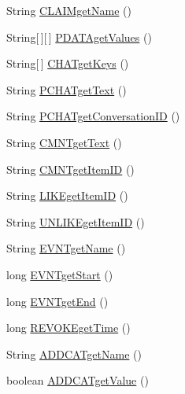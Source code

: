 \begin{DoxyCompactItemize}
String \hyperlink{classballmerpeak_1_1turtlenet_1_1shared_1_1Message_a618df0e74bdb53d97e624308dc197f9c}{C\-L\-A\-I\-Mget\-Name} ()
\item 
String\mbox{[}$\,$\mbox{]}\mbox{[}$\,$\mbox{]} \hyperlink{classballmerpeak_1_1turtlenet_1_1shared_1_1Message_a90be56d8792ff51cf52f76c91f321d5b}{P\-D\-A\-T\-Aget\-Values} ()
\item 
String\mbox{[}$\,$\mbox{]} \hyperlink{classballmerpeak_1_1turtlenet_1_1shared_1_1Message_abce412ceb51adecdb4cf27121150f151}{C\-H\-A\-Tget\-Keys} ()
\item 
String \hyperlink{classballmerpeak_1_1turtlenet_1_1shared_1_1Message_a37de2e088d9d7e29d68e46bc1268aa2d}{P\-C\-H\-A\-Tget\-Text} ()
\item 
String \hyperlink{classballmerpeak_1_1turtlenet_1_1shared_1_1Message_a3afb139c276865c16a1f73862a80ff38}{P\-C\-H\-A\-Tget\-Conversation\-I\-D} ()
\item 
String \hyperlink{classballmerpeak_1_1turtlenet_1_1shared_1_1Message_a98d82ce97581e1836c8c3c04296f9e4d}{C\-M\-N\-Tget\-Text} ()
\item 
String \hyperlink{classballmerpeak_1_1turtlenet_1_1shared_1_1Message_abcc08fb6d7d1ff58a0d2b853f14c96e0}{C\-M\-N\-Tget\-Item\-I\-D} ()
\item 
String \hyperlink{classballmerpeak_1_1turtlenet_1_1shared_1_1Message_a160e11cdf47694df3457be3f6d66b835}{L\-I\-K\-Eget\-Item\-I\-D} ()
\item 
String \hyperlink{classballmerpeak_1_1turtlenet_1_1shared_1_1Message_aa9cd511fcbefd56264ac9b027db6d6f2}{U\-N\-L\-I\-K\-Eget\-Item\-I\-D} ()
\item 
String \hyperlink{classballmerpeak_1_1turtlenet_1_1shared_1_1Message_aff33250286f93db9fbfdd4bbdca18848}{E\-V\-N\-Tget\-Name} ()
\item 
long \hyperlink{classballmerpeak_1_1turtlenet_1_1shared_1_1Message_a0664e413dd2a8f4522e3ff4be004f912}{E\-V\-N\-Tget\-Start} ()
\item 
long \hyperlink{classballmerpeak_1_1turtlenet_1_1shared_1_1Message_a6ef85e8b3cf1d2e12e24ea64fce69f47}{E\-V\-N\-Tget\-End} ()
\item 
long \hyperlink{classballmerpeak_1_1turtlenet_1_1shared_1_1Message_a7ec09e34d412ad3a9570a9efe347df68}{R\-E\-V\-O\-K\-Eget\-Time} ()
\item 
String \hyperlink{classballmerpeak_1_1turtlenet_1_1shared_1_1Message_a57a947a3373881692c77628e7ab9e5f6}{A\-D\-D\-C\-A\-Tget\-Name} ()
\item 
boolean \hyperlink{classballmerpeak_1_1turtlenet_1_1shared_1_1Message_a20b16c609b651c0ea12900564fab0b1f}{A\-D\-D\-C\-A\-Tget\-Value} ()

\end{DoxyCompactItemize}
